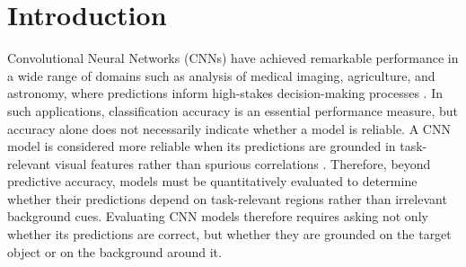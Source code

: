 \documentclass[a4paper,fleqn]{cas-dc}
\begin{document}
	\section{Introduction}
	\label{sec:introduction}
	Convolutional Neural Networks (CNNs) have achieved remarkable performance in a wide range of domains such as analysis of medical imaging, agriculture, and astronomy, where predictions inform high-stakes decision-making processes \cite{r1, r2, r3, r4}. 
	In such applications, classification accuracy is an essential performance measure, but accuracy alone does not necessarily indicate whether a model is reliable. 
	A CNN model is considered more reliable when its predictions are grounded in task-relevant visual features rather than spurious correlations \cite{r5}.
	Therefore, beyond predictive accuracy, models must be quantitatively evaluated to determine whether their predictions depend on task-relevant regions rather than irrelevant background cues. %
	Evaluating CNN models therefore requires asking not only whether its predictions are correct, but whether they are grounded on the target object or on the background around it.
	
	
\end{document}
